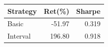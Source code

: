 {\tiny\setlength{\tabcolsep}{2pt}\begin{tabular}{lrr} \toprule
Strategy & Ret(\%) & Sharpe \\ \midrule
Basic & -51.97 & 0.319 \\ 
Interval & 196.80 & 0.918 \\ 
\bottomrule \end{tabular}}